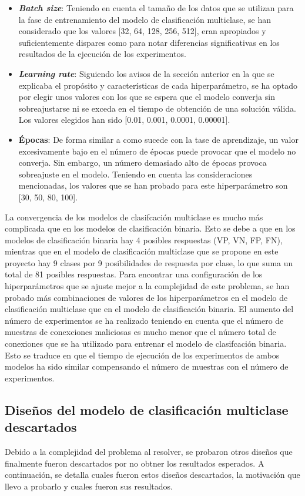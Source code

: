\begin{itemize}
	\item \textbf{\textit{Batch size}}: Teniendo en cuenta el tamaño de los datos que se utilizan para la fase de entrenamiento del modelo de clasificación multiclase, se han considerado que los valores [32, 64, 128, 256, 512], eran apropiados y suficientemente dispares como para notar diferencias significativas en los resultados de la ejecución de los experimentos.
	\item \textbf{\textit{Learning rate}}: Siguiendo los avisos de la sección anterior en la que se explicaba el propósito y características de cada hiperparámetro, se ha optado por elegir unos valores con los que se espera que el modelo converja sin sobreajustarse ni se exceda en el tiempo de obtención de una solución válida. Los valores elegidos han sido [0.01, 0.001, 0.0001, 0.00001].
	\item \textbf{Épocas}: De forma similar a como sucede con la tase de aprendizaje, un valor excesivamente bajo en el número de épocas puede provocar que el modelo no converja. Sin embargo, un número demasiado alto de épocas provoca sobreajuste en el modelo. Teniendo en cuenta las consideraciones mencionadas, los valores que se han probado para este hiperparámetro son [30, 50, 80, 100].
\end{itemize}

La convergencia de los modelos de clasifcación multiclase es mucho más complicada que en los modelos de clasificación binaria. Esto se debe a que en los modelos de clasificación binaria hay 4 posibles respuestas (VP, VN, FP, FN), mientras que en el  modelo de clasificación multiclase que se propone en este proyecto hay 9 clases por 9 posibilidades de respuesta por clase, lo que suma un total de 81 posibles respuestas. Para encontrar una configuración de los hiperparámetros que se ajuste mejor a la complejidad de este problema, se han probado más combinaciones de valores de los hiperparámetros en el modelo de clasificación multiclase que en el modelo de clasificación binaria. El aumento del número de experimentos se ha realizado teniendo en cuenta que el número de muestras de conexciones maliciosas es mucho menor que el número total de conexiones que se ha utilizado para entrenar el modelo de clasifcación binaria. Esto se traduce en que el tiempo de ejecución de los experimentos de ambos modelos ha sido similar compensando el número de muestras con el número de experimentos.

\subsection{Diseños del modelo de clasificación multiclase descartados} \label{subsec:MCMdescart}
Debido a la complejidad del problema al resolver, se probaron otros diseños que finalmente fueron descartados por no obtner los resultados esperados. A continuación, se detalla cuales fueron estos diseños descartados, la motivación que llevo a probarlo y cuales fueron sus resultados.

